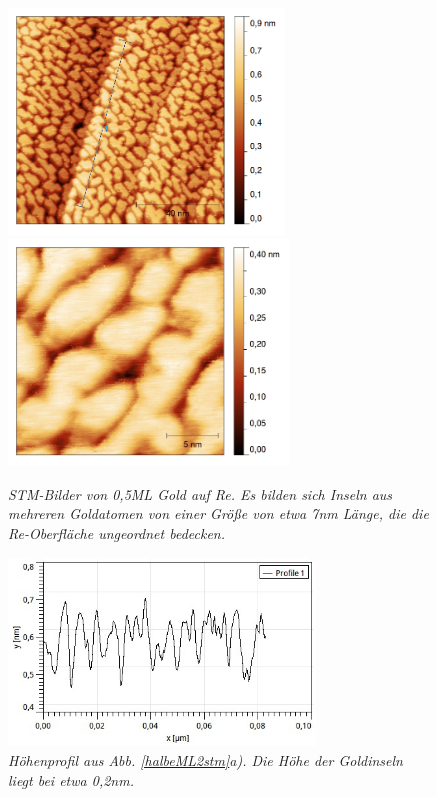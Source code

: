 \begin{figure}[htbp]
	\begin{minipage}[b]{0.5\textwidth} 
		\includegraphics[height=6cm]{profilhalbeML.png}
	\end{minipage}
	\hfill
	\begin{minipage}[b]{0.5\textwidth}
		\includegraphics[height=6cm]{halbeML.jpg}
	\end{minipage}
	\caption{\textit{STM-Bilder von 0,5ML Gold auf Re. Es bilden sich Inseln aus mehreren Goldatomen
	von einer Größe von etwa 7nm Länge, die die Re-Oberfläche ungeordnet bedecken.}}
	\label{halbeML2stm} 
	\vfill
	\centering
		\includegraphics[height=5cm]{profilhalbeML.jpg}
	\caption{\textit{Höhenprofil aus Abb. \ref{halbeML2stm}a). Die Höhe der Goldinseln liegt bei etwa
	0,2nm.}}
	\label{profilhalbeML} 
\end{figure}


